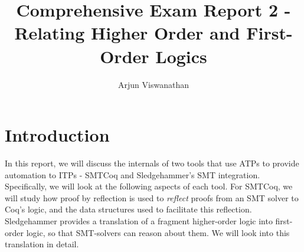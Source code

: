 \documentclass{article}
\begin{document}
\title{Comprehensive Exam Report 2 - Relating Higher Order and First-Order Logics}
\author{Arjun Viswanathan}
\date{}
\maketitle

\section{Introduction}
\label{sec:intro}
	In this report, we will discuss the internals 
	of two tools that use ATPs to provide 
	automation to ITPs - SMTCoq and Sledgehammer's
	SMT integration. Specifically, we will look
	at the following aspects of each tool. 
	For SMTCoq, we will study 
	how proof by reflection is used to 
	\textit{reflect} proofs from an SMT solver
	to Coq's logic, and the data structures 
	used to facilitate this reflection.
	Sledgehammer provides a translation of 
	a fragment higher-order logic into 
	first-order logic, so that 
	SMT-solvers can reason about them. We will
	look into this translation in detail.



\end{document}
